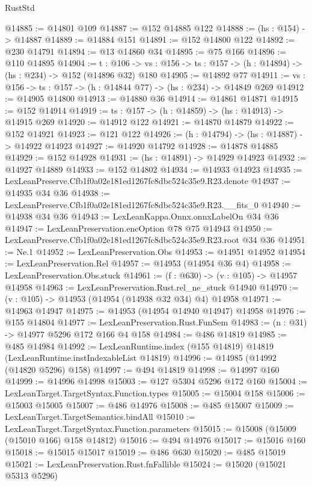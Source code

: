 \begin{lexlean}{RustStd}
\begin{coremodule}
@14885 := @14801 @109
@14887 := @152 @14885 @122
@14888 := (hs : @154) -> @14887
@14889 := @14884 @151
@14891 := @152 @14800 @122
@14892 := @230 @14791
@14894 := @13 @14860 @34
@14895 := @75 @166
@14896 := @110 @14895
@14904 := {t : @106} ->
  {vs : @156} -> {ts : @157} -> (h : @14894) -> (hs : @234) -> @152 (@14896 @32) @180
@14905 := @14892 @77
@14911 := {vs : @156} -> {ts : @157} -> (h : @14844 @77) -> (hs : @234) -> @14849 @269
@14912 := @14905 @14800
@14913 := @14880 @36
@14914 := @14861 @14871
@14915 := @152 @14914
@14919 := {ts : @157} -> (h : @14859) -> (hs : @14913) -> @14915 @269
@14920 := @14912 @122
@14921 := @14870 @14879
@14922 := @152 @14921
@14923 := @121 @122
@14926 := (h : @14794) -> (hs : @14887) -> @14922 @14923
@14927 := @14920 @14792
@14928 := @14878 @14885
@14929 := @152 @14928
@14931 := (hs : @14891) -> @14929 @14923
@14932 := @14927 @14889
@14933 := @152 @14802
@14934 := @14933 @14923
@14935 := LexLeanPreserve.Cfb1f0a02e181ed1267fc8dbc524c35e9.R23.denote
@14937 := @14935 @34 @36
@14938 := LexLeanPreserve.Cfb1f0a02e181ed1267fc8dbc524c35e9.R23.__fits_0
@14940 := @14938 @34 @36
@14943 := LexLeanKappa.Onnx.onnxLabelOn @34 @36
@14947 := LexLeanPreservation.encOption @78 @75 @14943
@14950 := LexLeanPreserve.Cfb1f0a02e181ed1267fc8dbc524c35e9.R23.root @34 @36
@14951 := Ne.{1}
@14952 := LexLeanPreservation.Obs
@14953 := @14951 @14952
@14954 := LexLeanPreservation.Rel
@14957 := @14953 (@14954 @36 @4)
@14958 := LexLeanPreservation.Obs.stuck
@14961 := (f : @630) -> (v : @105) -> @14957 @14958
@14963 := LexLeanPreservation.Rust.rel_ne_stuck @14940
@14970 := (v : @105) -> @14953 (@14954 (@14938 @32 @34) @4) @14958
@14971 := @14963 @14947
@14975 := @14953 (@14954 @14940 @14947) @14958
@14976 := @155 @14804
@14977 := LexLeanPreservation.Rust.FunSem
@14983 := (n : @31) -> @14977 @5296 @172 @166 @4 @158
@14984 := @486 @14819
@14985 := @485 @14984
@14992 := LexLeanRuntime.index (@155 @14819) @14819 (LexLeanRuntime.instIndexableList @14819)
@14996 := @14985 (@14992 (@14820 @5296) @158)
@14997 := @494 @14819
@14998 := @14997 @160
@14999 := @14996 @14998
@15003 := @127 @5304 @5296 @172 @160
@15004 := LexLeanTarget.TargetSyntax.Function.types
@15005 := @15004 @158
@15006 := @15003 @15005
@15007 := @486 @14976
@15008 := @485 @15007
@15009 := LexLeanTarget.TargetSemantics.bindAll
@15010 := LexLeanTarget.TargetSyntax.Function.parameters
@15015 := @15008 (@15009 (@15010 @166) @158 @14812)
@15016 := @494 @14976
@15017 := @15016 @160
@15018 := @15015 @15017
@15019 := @486 @630
@15020 := @485 @15019
@15021 := LexLeanPreservation.Rust.fnFallible
@15024 := @15020 (@15021 @5313 @5296)

\end{coremodule}
\end{lexlean}
